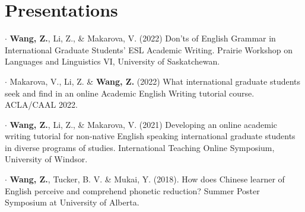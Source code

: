 \documentclass[letterpaper,11pt]{article}
\newcommand{\resumeSubHeadingListStart}{\begin{itemize}[leftmargin=0.15in, label={}]}
\newcommand{\resumeSubHeadingListEnd}{\end{itemize}}
\begin{document}
\section{Presentations}


  \resumeSubHeadingListStart
    \small{\item{
        $\cdot$ \textbf{Wang, Z.}, Li, Z., \& Makarova, V. (2022) Don’ts of English Grammar in International Graduate Students’ ESL Academic Writing. Prairie Workshop on Languages and Linguistics VI, University of Saskatchewan. \\ \vspace{2pt}
        
        $\cdot$ Makarova, V., Li, Z. \& \textbf{Wang, Z.} (2022) What international graduate students seek and find in an online Academic English Writing tutorial course. ACLA/CAAL 2022. \\ \vspace{2pt}
        
        $\cdot$ \textbf{Wang, Z.}, Li, Z., \& Makarova, V. (2021) Developing an online academic writing tutorial for non-native English speaking international graduate students in diverse programs of studies. International Teaching Online Symposium, University of Windsor. \\ \vspace{2pt}
        
        $\cdot$ \textbf{Wang, Z.}, Tucker, B. V. \& Mukai, Y. (2018). How does Chinese learner of English perceive and comprehend phonetic reduction? Summer Poster Symposium at University of Alberta.
    }} \\ \vspace{-5pt}
  \resumeSubHeadingListEnd
  
\end{document}
